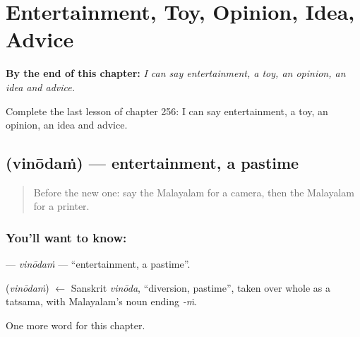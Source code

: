 
\chapter{Entertainment, Toy, Opinion, Idea, Advice}
\label{ch:ml-entertainment-toy-opinion-idea-advice}

\begin{chapteropening}
\textbf{By the end of this chapter:} \emph{I can say entertainment, a toy, an opinion, an idea and advice.}

Complete the last lesson of chapter 256: I can say entertainment, a toy, an opinion, an idea and advice.
\end{chapteropening}

\section[\texorpdfstring{\ml{വിനോദം} (vinōdaṁ)}{വിനോദം (vinōdaṁ)}]{ (vinōdaṁ) — entertainment, a pastime}

\label{lesson:ML-C256-vinodam}



\begin{quote}
Before the new one: say the Malayalam for a camera, then the Malayalam for a printer.
\end{quote}

\subsection*{You'll want to know: }
\textbf{} — \emph{vinōdaṁ} — \textquotedblleft{}entertainment, a pastime\textquotedblright{}.

\begin{cousinweb}
\textbf{} (\emph{vinōdaṁ}) $\leftarrow$ Sanskrit \emph{vinōda}, \textquotedblleft{}diversion, pastime\textquotedblright{}, taken over whole as a tatsama, with Malayalam's noun ending \emph{-ṁ}.
\end{cousinweb}

\begin{grammarlens}[title={What you've built}]
One more word for this chapter.
\end{grammarlens}

